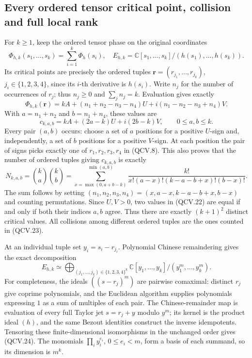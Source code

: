 \subsection{Every ordered tensor critical point, collision and full local rank}

For \(k\geq1\), keep the ordered tensor phase on the original
coordinates
\[
 \Phi_{h,k}(s_1,\ldots,s_k)=\sum_{i=1}^k\Phi_h(s_i),
 \quad E_{h,k}=\mathbb{C}[s_1,\ldots,s_k]/(h(s_1),\ldots,h(s_k)).
 \tag{QCV.20}
\]
Its critical points are precisely the ordered tuples
\(\mathbf r=(r_{j_1},\ldots,r_{j_k})\), \(j_i\in\{1,2,3,4\}\),
since its \(i\)-th derivative is \(h(s_i)\). Write \(n_j\) for
the number of occurrences of \(r_j\); thus \(n_j\geq0\) and
\(\sum_jn_j=k\). Evaluation gives exactly
\[
 \Phi_{h,k}(\mathbf r)=kA+(n_1+n_2-n_3-n_4)U
                           +i(n_1-n_2-n_3+n_4)V.
 \tag{QCV.21}
\]
With \(a=n_1+n_2\) and \(b=n_1+n_4\), these values are
\[
 c_{k,a,b}=kA+(2a-k)U+i(2b-k)V,
                  \qquad 0\leq a,b\leq k.
 \tag{QCV.22}
\]
Every pair \((a,b)\) occurs: choose a set of \(a\) positions for a
positive \(U\)-sign and, independently, a set of \(b\) positions
for a positive \(V\)-sign. At each position the pair of signs picks
exactly one of \(r_1,r_2,r_3,r_4\) in (QCV.8). This also proves
that the number of ordered tuples giving \(c_{k,a,b}\) is exactly
\[
 N_{k,a,b}=\binom ka\binom kb
 =\sum_{x=\max(0,a+b-k)}^{\min(a,b)}
   \frac{k!}{x!(a-x)!(k-a-b+x)!(b-x)!}.
 \tag{QCV.23}
\]
The sum follows by setting
\((n_1,n_2,n_3,n_4)=(x,a-x,k-a-b+x,b-x)\) and counting
permutations. Since \(U,V>0\), two values in (QCV.22) are equal
if and only if both their indices \(a,b\) agree. Thus there are
exactly \((k+1)^2\) distinct critical values. All collisions among
different ordered tuples are the ones counted in (QCV.23).

At an individual tuple set \(y_i=s_i-r_{j_i}\). Polynomial Chinese
remaindering gives the exact decomposition
\[
 E_{h,k}\simeq
 \bigoplus_{(j_1,\ldots,j_k)\in\{1,2,3,4\}^k}
 \mathbb{C}[y_1,\ldots,y_k]/(y_1^m,\ldots,y_k^m).
 \tag{QCV.24}
\]
For completeness, the ideals \(((s-r_j)^m)\) are pairwise
comaximal: distinct \(r_j\) give coprime polynomials, and the
Euclidean algorithm supplies polynomials expressing \(1\) as a
sum of multiples of each pair. The Chinese-remainder map is
evaluation of every full Taylor jet \(s=r_j+y\) modulo \(y^m\);
its kernel is the product ideal \((h)\), and the same Bezout
identities construct the inverse idempotents. Tensoring these
finite-dimensional isomorphisms in the unchanged order gives
(QCV.24). The monomials \(\prod_i y_i^{e_i}\), \(0\leq e_i<m\),
form a basis of each summand, so its dimension is \(m^k\).

